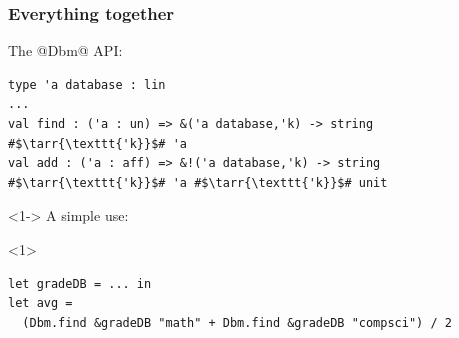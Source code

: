 \documentclass[aspectratio=169,dvipsnames,svgnames,10pt]{beamer}
\begin{document}
\begin{frame}[fragile]
  \frametitle{Everything together}

  The @Dbm@ API:
\begin{verbatim}
type 'a database : lin
...
val find : ('a : un) => &('a database,'k) -> string #$\tarr{\texttt{'k}}$# 'a
val add : ('a : aff) => &!('a database,'k) -> string #$\tarr{\texttt{'k}}$# 'a #$\tarr{\texttt{'k}}$# unit
\end{verbatim}
  
  \begin{onlyenv}<1->
    A simple use:
  \end{onlyenv}
  \begin{onlyenv}<1>
\begin{verbatim}
let gradeDB = ... in
let avg =
  (Dbm.find &gradeDB "math" + Dbm.find &gradeDB "compsci") / 2


\end{verbatim}
\end{onlyenv}
\end{frame}
\end{document}
